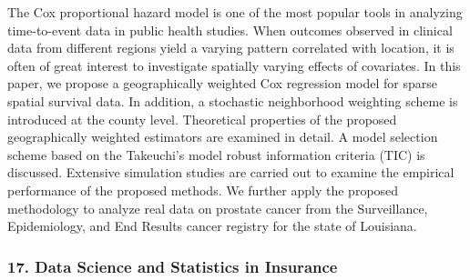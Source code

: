 \begin{itemize}
The Cox proportional hazard model is one of the most popular tools in analyzing time-to-event data in public health studies. When outcomes observed in clinical data from different regions yield a varying pattern correlated with location, it is often of great interest to investigate spatially varying effects of covariates. In this paper, we propose a geographically weighted Cox regression model for sparse spatial survival data. In addition, a stochastic neighborhood weighting scheme is introduced at the county level. Theoretical properties of the proposed geographically weighted estimators are examined in detail. A model selection scheme based on the Takeuchi’s model robust information criteria (TIC) is discussed. Extensive simulation studies are carried out to examine the empirical performance of the proposed methods. We further apply the proposed methodology to analyze real data on prostate cancer from the Surveillance, Epidemiology, and End Results cancer registry for the state of Louisiana.

\end{itemize}

\subsubsection*{17. Data Science and Statistics in Insurance}

